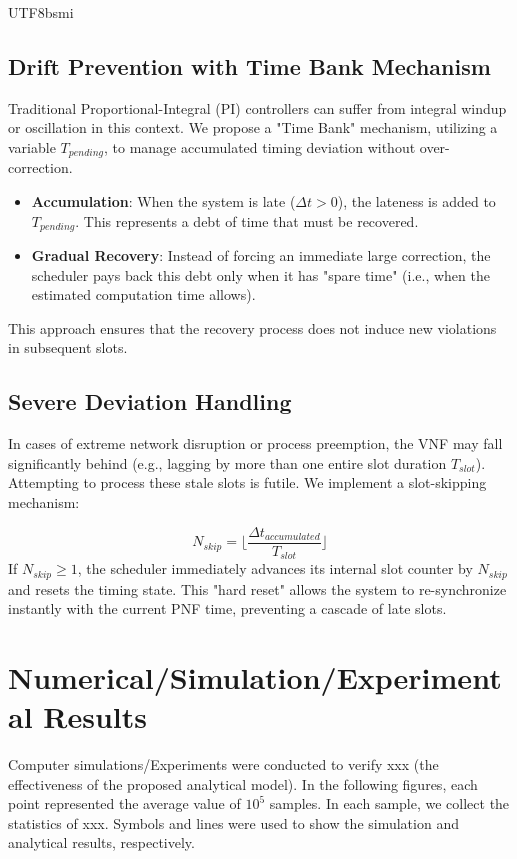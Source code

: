 \documentclass[conference]{IEEEtran}
\begin{document}
\begin{CJK}{UTF8}{bsmi}
{\subsection{Drift Prevention with Time Bank Mechanism}
Traditional Proportional-Integral (PI) controllers can suffer from integral windup or oscillation in this context. We propose a "Time Bank" mechanism, utilizing a variable $T_{pending}$, to manage accumulated timing deviation without over-correction.
\begin{itemize}
    \item \textbf{Accumulation}: When the system is late ($\Delta t > 0$), the lateness is added to $T_{pending}$. This represents a debt of time that must be recovered.
    \item \textbf{Gradual Recovery}: Instead of forcing an immediate large correction, the scheduler pays back this debt only when it has "spare time" (i.e., when the estimated computation time allows).
\end{itemize}
This approach ensures that the recovery process does not induce new violations in subsequent slots.

\subsection{Severe Deviation Handling}
In cases of extreme network disruption or process preemption, the VNF may fall significantly behind (e.g., lagging by more than one entire slot duration $T_{slot}$). Attempting to process these stale slots is futile.
We implement a slot-skipping mechanism:
}
\begin{equation}
    N_{skip} = \lfloor \frac{\Delta t_{accumulated}}{T_{slot}} \rfloor
\end{equation}
{\color{blue}
If $N_{skip} \ge 1$, the scheduler immediately advances its internal slot counter by $N_{skip}$ and resets the timing state. This "hard reset" allows the system to re-synchronize instantly with the current PNF time, preventing a cascade of late slots.
}


\section{Numerical/Simulation/Experimental Results}
Computer simulations/Experiments were conducted to verify xxx (the effectiveness of the proposed analytical model). 
In the following figures, each point represented the average value of $10^5$ samples. In each sample, we collect the statistics of xxx. Symbols and lines were used to show the simulation and analytical results, respectively. 


\end{CJK}
\end{document}

